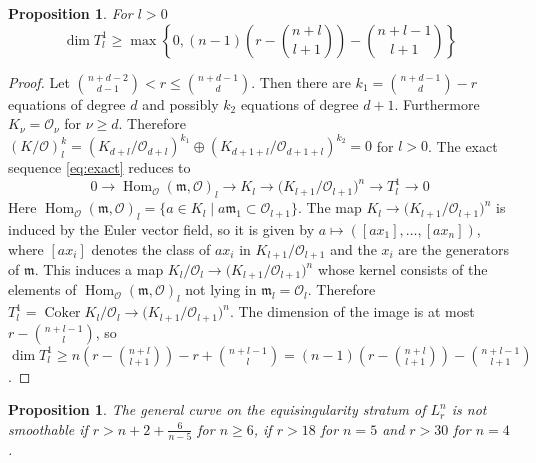 \documentclass{amsart}
\newcommand {\m}{\mathfrak{m}}
\DeclareMathOperator{\Coker}{Coker}
\DeclareMathOperator{\Hom}{Hom}
\renewcommand{\ell}{l}
\newcommand{\mO}{\mathcal{O}}
\newtheorem{prop}[thm]{Proposition}
\theoremstyle{definition}
\theoremstyle{remark}
\begin{document}
\begin{prop}\label{prop:tplus}
For $\ell >0$
\[\dim T^1_{\ell} \geq 
\max \left\{0, (n-1)\left(r-\binom{n+\ell}{\ell+1}\right)-\binom{n+\ell-1}{\ell+1}\right\}\]
\end{prop}
\begin{proof} Let $\binom{n+d-2}{d-1} <r \leq \binom{n+d-1}{d}$. Then there are
$k_1= \binom{n+d-1}{d}-r $ equations of degree $d$ and possibly $k_2$ equations
of degree $d+1$. Furthermore $K_\nu=\mO_\nu$ for $\nu\geq d$. Therefore $(K/\mO)^k_{\ell}=
(K_{d+\ell}/\mO_{d+\ell})^{k_1}\oplus (K_{d+1+\ell}/\mO_{d+1+\ell})^{k_2}=0$
for $\ell >0$. The exact sequence \eqref{eq:exact} reduces to 
\[
 0 \to \Hom_\mO(\m,\mO)_{\ell} \to K_{\ell} \to \big(K_{\ell+1}/\mO_{\ell+1}\big)^n \to T^1_{\ell} \to 0
 \]
 Here $\Hom_\mO(\m,\mO)_{\ell} =\{ a\in K_{\ell}\mid a \m_1\subset \mO_{\ell+1}\}$. The map
 $K_{\ell}\to \big(K_{\ell+1}/\mO_{\ell+1}\big)^n$ is induced by the Euler vector field, so
it is given by $a\mapsto ([ax_1],\dots,[ax_n])$, where $[ax_i]$ denotes the class of $ax_i$
in $K_{\ell+1}/\mO_{\ell+1}$ and the $x_i$ are the generators of $\m$. This induces
a map $K_{\ell}/\mO_{\ell} \to (K_{\ell+1}/\mO_{\ell+1}\big)^n$ whose kernel consists
of the elements of $\Hom_\mO(\m,\mO)_{\ell}$ not lying in $\m_{\ell}=\mO_{\ell}$.
Therefore $ T^1_{\ell} = \Coker K_{\ell}/\mO_{\ell} \to  (K_{\ell+1}/\mO_{\ell+1}\big)^n$.
The dimension of the image is at most $r-\binom{n+\ell-1}{\ell}$, so
$\dim T^1_{\ell} \geq  n(r-\binom{n+\ell}{\ell+1})-r+\binom{n+\ell-1}{\ell}
=  (n-1)\left(r-\binom{n+\ell}{\ell+1}\right)-\binom{n+\ell-1}{\ell+1}$.
\end{proof}

\begin{prop}\label{prop:notsm}
The general curve on the equisingularity stratum of $L_r^n$  is not smoothable
if $r> n+2+\frac6{n-5}$ for $n\geq6$, if $r>18$ for $n=5$ and $r>30$ for $n=4$.
\end{prop}
\end{document}
